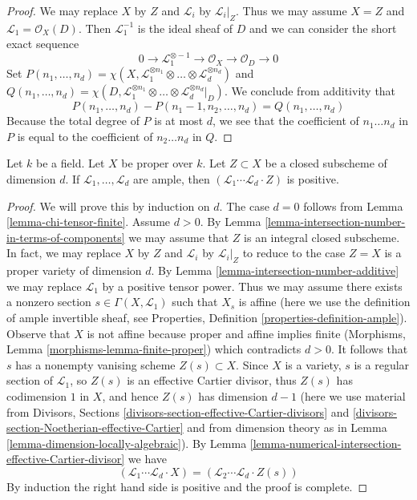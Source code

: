 \begin{proof}
We may replace $X$ by $Z$ and $\mathcal{L}_i$ by $\mathcal{L}_i|_Z$.
Thus we may assume $X = Z$ and $\mathcal{L}_1 = \mathcal{O}_X(D)$.
Then $\mathcal{L}_1^{-1}$ is the ideal sheaf of $D$ and we can
consider the short exact sequence
$$
0 \to \mathcal{L}_1^{\otimes -1} \to \mathcal{O}_X \to \mathcal{O}_D \to 0
$$
Set
$P(n_1, \ldots, n_d) =
\chi(X, \mathcal{L}_1^{\otimes n_1} \otimes \ldots \otimes
\mathcal{L}_d^{\otimes n_d})$
and
$Q(n_1, \ldots, n_d) =
\chi(D, \mathcal{L}_1^{\otimes n_1} \otimes \ldots \otimes
\mathcal{L}_d^{\otimes n_d}|_D)$.
We conclude from additivity that
$$
P(n_1, \ldots, n_d) - P(n_1 - 1, n_2, \ldots, n_d) =
Q(n_1, \ldots, n_d)
$$
Because the total degree of $P$ is at most $d$, we see that
the coefficient of $n_1 \ldots n_d$ in $P$ is equal to the coefficient
of $n_2 \ldots n_d$ in $Q$.
\end{proof}

\begin{lemma}
\label{lemma-ample-positive}
Let $k$ be a field. Let $X$ be proper over $k$. Let $Z \subset X$ be
a closed subscheme of dimension $d$. If $\mathcal{L}_1, \ldots, \mathcal{L}_d$
are ample, then $(\mathcal{L}_1 \cdots \mathcal{L}_d \cdot Z)$ is positive.
\end{lemma}

\begin{proof}
We will prove this by induction on $d$. The case $d = 0$
follows from Lemma \ref{lemma-chi-tensor-finite}. Assume $d > 0$.
By Lemma \ref{lemma-intersection-number-in-terms-of-components}
we may assume that $Z$ is an integral closed subscheme.
In fact, we may replace $X$ by $Z$ and $\mathcal{L}_i$
by $\mathcal{L}_i|_Z$ to reduce to the case $Z = X$ is a
proper variety of dimension $d$.
By Lemma \ref{lemma-intersection-number-additive}
we may replace $\mathcal{L}_1$ by a positive tensor power.
Thus we may assume there exists a nonzero section
$s \in \Gamma(X, \mathcal{L}_1)$
such that $X_s$ is affine (here we use the definition of
ample invertible sheaf, see
Properties, Definition \ref{properties-definition-ample}).
Observe that $X$ is not affine because proper and affine
implies finite (Morphisms, Lemma \ref{morphisms-lemma-finite-proper})
which contradicts $d > 0$. It follows that $s$ has a nonempty vanising
scheme $Z(s) \subset X$. Since $X$ is a variety, $s$ is a regular section
of $\mathcal{L}_1$, so $Z(s)$ is an effective Cartier divisor,
thus $Z(s)$ has codimension $1$ in $X$, and
hence $Z(s)$ has dimension $d - 1$ (here we use material from
Divisors, Sections \ref{divisors-section-effective-Cartier-divisors} and
\ref{divisors-section-Noetherian-effective-Cartier} and from dimension theory
as in Lemma \ref{lemma-dimension-locally-algebraic}).
By Lemma \ref{lemma-numerical-intersection-effective-Cartier-divisor}
we have
$$
(\mathcal{L}_1 \cdots \mathcal{L}_d \cdot X) =
(\mathcal{L}_2 \cdots \mathcal{L}_d \cdot Z(s))
$$
By induction the right hand side is positive and the proof is complete.
\end{proof}

